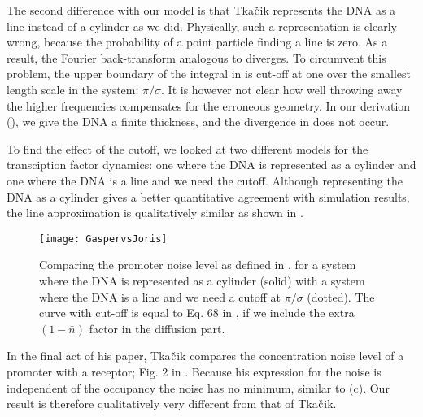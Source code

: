 The second difference with our model is that Tka$\check{\rm c}$ik represents the DNA as a line instead of a cylinder as we did. Physically, such a representation is clearly wrong, because the probability of a point particle finding a line is zero. As a result, the Fourier back-transform analogous to  diverges. To circumvent this problem, the upper boundary of the integral in \cite{Tkacik2009} is cut-off at one over the smallest length scale in the system: $\pi/\sigma$. It is however not clear how well throwing away the higher frequencies compensates for the erroneous geometry. In our derivation (), we give the DNA a finite thickness, and the divergence in  does not occur. 

To find the effect of the cutoff, we looked at two different models for the transciption factor dynamics: one where the DNA is represented as a cylinder and one where the DNA is a line and we need the cutoff. Although representing the DNA as a cylinder gives a better quantitative agreement with simulation results, the line approximation is qualitatively similar as shown in .


\begin{figure}
\centering
\texttt{[image: GaspervsJoris]}
\caption{ Comparing the promoter noise level as defined in , for a system where the DNA is represented as a cylinder (solid) with a system where the DNA is a line and we need a cutoff at $\pi/\sigma$ (dotted). The curve with cut-off is equal to Eq. 68 in \cite{Tkacik2009}, if we include the extra $(1-\bar{n})$ factor in the diffusion part.}
\end{figure}

In the final act of his paper, Tka$\check{\rm c}$ik compares the concentration noise level of a promoter with a receptor; Fig. 2 in \cite{Tkacik2009}. Because his expression for the noise is independent of the occupancy the noise has no minimum, similar to  (c). Our result is therefore qualitatively very different from that of Tka$\check{\rm c}$ik.




